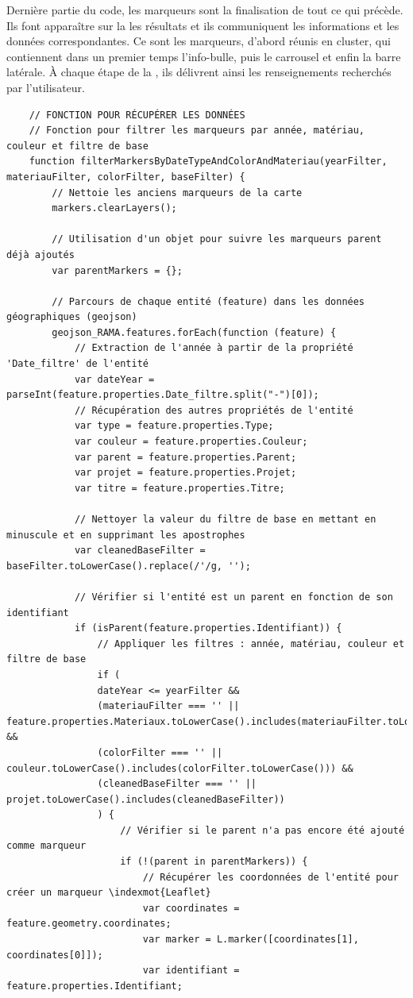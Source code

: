 Dernière partie du code, les marqueurs sont la finalisation de tout ce qui précède. Ils font apparaître sur la  les résultats et ils communiquent les informations et les données correspondantes. Ce sont les marqueurs, d’abord réunis en cluster, qui contiennent dans un premier temps l’info-bulle, puis le carrousel et enfin la barre latérale. À chaque étape de la , ils délivrent ainsi les renseignements recherchés par l’utilisateur.\par
\begin{lstlisting}
	// FONCTION POUR RÉCUPÉRER LES DONNÉES
	// Fonction pour filtrer les marqueurs par année, matériau, couleur et filtre de base
	function filterMarkersByDateTypeAndColorAndMateriau(yearFilter, materiauFilter, colorFilter, baseFilter) {
		// Nettoie les anciens marqueurs de la carte
		markers.clearLayers();
		
		// Utilisation d'un objet pour suivre les marqueurs parent déjà ajoutés
		var parentMarkers = {};
		
		// Parcours de chaque entité (feature) dans les données géographiques (geojson)
		geojson_RAMA.features.forEach(function (feature) {
			// Extraction de l'année à partir de la propriété 'Date_filtre' de l'entité
			var dateYear = parseInt(feature.properties.Date_filtre.split("-")[0]);
			// Récupération des autres propriétés de l'entité
			var type = feature.properties.Type;
			var couleur = feature.properties.Couleur;
			var parent = feature.properties.Parent;
			var projet = feature.properties.Projet;
			var titre = feature.properties.Titre;
			
			// Nettoyer la valeur du filtre de base en mettant en minuscule et en supprimant les apostrophes
			var cleanedBaseFilter = baseFilter.toLowerCase().replace(/'/g, '');
			
			// Vérifier si l'entité est un parent en fonction de son identifiant
			if (isParent(feature.properties.Identifiant)) {
				// Appliquer les filtres : année, matériau, couleur et filtre de base
				if (
				dateYear <= yearFilter &&
				(materiauFilter === '' || feature.properties.Materiaux.toLowerCase().includes(materiauFilter.toLowerCase())) &&
				(colorFilter === '' || couleur.toLowerCase().includes(colorFilter.toLowerCase())) &&
				(cleanedBaseFilter === '' || projet.toLowerCase().includes(cleanedBaseFilter))
				) {
					// Vérifier si le parent n'a pas encore été ajouté comme marqueur
					if (!(parent in parentMarkers)) {
						// Récupérer les coordonnées de l'entité pour créer un marqueur \indexmot{Leaflet}
						var coordinates = feature.geometry.coordinates;
						var marker = L.marker([coordinates[1], coordinates[0]]);
						var identifiant = feature.properties.Identifiant;
						

\end{lstlisting}

